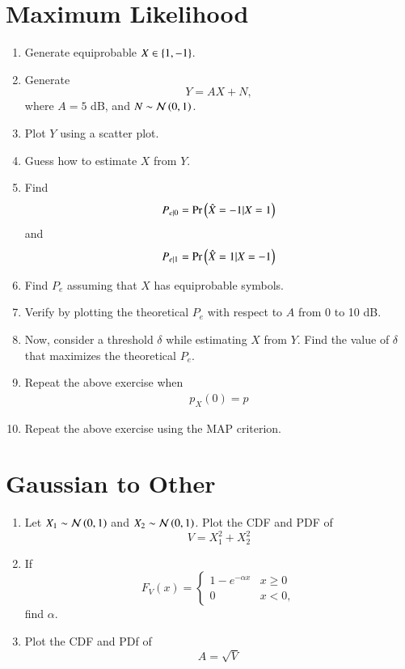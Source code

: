 \documentclass[journal,12pt,twocolumn]{IEEEtran}
\renewcommand\thesection{\arabic{section}}
\begin{document}
\begin{enumerate}[label=\thesection.\arabic*,ref=\thesection.\theenumi]
\begin{enumerate}[label=\thesection.\arabic*
,ref=\thesection.\theenumi]
\end{enumerate}
\section{Maximum Likelihood}
\begin{enumerate}[label=\thesection.\arabic*
,ref=\thesection.\theenumi]
\item Generate equiprobable $X \in \left\{1,-1\right\}$.
\item Generate
\begin{equation}
Y = AX+N,
\end{equation}
		where $A = 5$ dB,  and $N \sim \mathcal{N}\left(0,1\right)$.
	\item Plot $Y$ using a scatter plot.
	\item Guess how to estimate $X$ from $Y$.
\item
\label{ml-ch4_sim}
Find
\begin{equation}
	P_{e|0} = \Pr\left(\hat{X} = -1|X=1\right)
\end{equation}
and
\begin{equation}
	P_{e|1} = \Pr\left(\hat{X} = 1|X=-1\right)
\end{equation}
%
\item Find $P_e$ assuming that $X$ has equiprobable symbols.
%
\item
Verify by plotting  the theoretical $P_e$ with respect to $A$ from 0 to 10 dB.
%
\item Now, consider a threshold $\delta$  while estimating $X$ from $Y$. Find the value of $\delta$ that maximizes the theoretical $P_e$.
\item Repeat the above exercise when
	\begin{align}
		p_{X}(0) = p
	\end{align}
\item Repeat the above exercise using the MAP criterion.
		\end{enumerate}
\section{Gaussian to Other}
\begin{enumerate}[label=\thesection.\arabic*
,ref=\thesection.\theenumi]
\item
Let $X_1 \sim  \mathcal{N}\left(0,1\right)$ and $X_2 \sim  \mathcal{N}\left(0,1\right)$. Plot the CDF and PDF of
%
\begin{equation}
V = X_1^2 + X_2^2
\end{equation}
%
%
%
\item
If
%
\begin{equation}
F_{V}(x) =
\begin{cases}
1 - e^{-\alpha x} & x \geq 0 \\
0 & x < 0,
\end{cases}
\end{equation}
%
find $\alpha$.
%
\item
\label{ch3_raleigh_sim}
Plot the CDF and PDf of
%
\begin{equation}
A = \sqrt{V}
\end{equation}
%
\end{enumerate}

\end{enumerate}
\end{document}
